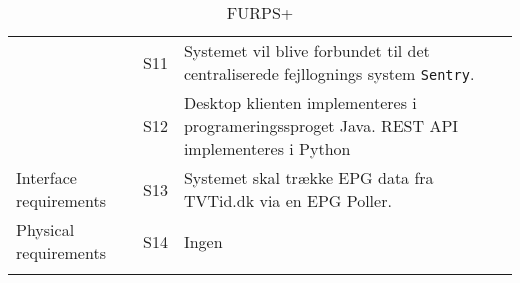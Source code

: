 \begin{center}
\begin{longtable}[h]{|p{4cm}|p{1cm}|p{11cm}|}
                                            & S11           & Systemet vil blive forbundet til det centraliserede fejllognings system \texttt{Sentry}.\\ \cline{2-3}   
                                            & S12           & Desktop klienten implementeres i programeringssproget Java. REST API implementeres i Python\\ \hline
        Interface requirements              & S13           & Systemet skal trække EPG data fra TVTid.dk via en EPG Poller. \\ \hline
        Physical requirements               & S14           & Ingen\\ \hline
    \caption{FURPS+}
    \label{tab:furps+}
    \end{longtable}
\end{center}